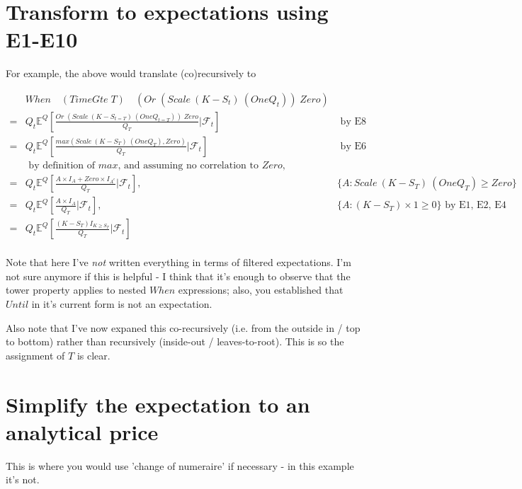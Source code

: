 \documentclass[a4paper]{article}
\begin{document}
\section{Transform to expectations using E1-E10}

For example, the above would translate (co)recursively to

\begin{align*}
& When \quad (TimeGte \; T) \quad (Or \; (Scale \: (K - S_t) \: (One Q_t)) \; Zero) \\
= & Q_t \mathbb{E}^Q[ \frac{ Or \; (Scale \: (K - S_{t = T}) \: (One Q_{t = T})) \; Zero } { Q_T } | \mathcal{F}_t ] & \text{ by E8} \\
= & Q_t \mathbb{E}^Q[ \frac{ max ( Scale \: (K - S_T) \: (One Q_T) , Zero ) } { Q_T } | \mathcal{F}_t ] & \text{ by E6} \\
& \text{ by definition of $max$, and assuming no correlation to $Zero$, } \\
= & Q_t \mathbb{E}^Q[ \frac{  A \times I_A  + Zero \times I_{A^c}} { Q_T } | \mathcal{F}_t ] , & \{ A : Scale \: (K - S_T) \: (One Q_T) \geq Zero \} \\
= & Q_t \mathbb{E}^Q[ \frac{  A \times I_A } { Q_T } | \mathcal{F}_t ] , & \{ A : (K - S_T) \times 1 \geq 0 \} \text{ by E1, E2, E4} \\
= & Q_t \mathbb{E}^Q[ \frac{  (K - S_T) I_{K \geq S_T} } { Q_T } | \mathcal{F}_t ] \\
\end{align*}

Note that here I've \emph{not} written everything in terms of filtered expectations. I'm not sure anymore if this is helpful - I think that it's enough to observe that the tower property applies to nested $When$ expressions; also, you established that $Until$ in it's current form is not an expectation. 

Also note that I've now expaned this co-recursively (i.e. from the outside in / top to bottom) rather than recursively (inside-out / leaves-to-root). This is so the assignment of $T$ is clear.

\section{Simplify the expectation to an analytical price}

This is where you would use 'change of numeraire' if necessary - in this example it's not.
\end{document}
